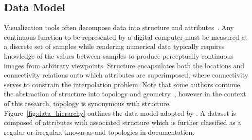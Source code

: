 \subsection{Data Model}
Visualization tools often decompose data into structure and
attributes~\cite{vtk}. Any continuous function to be represented by a
digital computer must be measured at a discrete set of samples while
rendering numerical data typically requires knowledge of the values
between samples to produce perceptually continuous images from
arbitrary viewpoints. Structure encapsulates both the locations and
connectivity relations onto which attributes are superimposed, where
connectivity serves to constrain the interpolation problem. Note that
some authors continue the abstraction of structure into topology and
geometry~\cite{weiler}, however in the context of this research,
topology is synonymous with structure. Figure~\ref{fig:data_hierarchy}
outlines the data model adopted by \sciwms{}. A dataset is composed of
attributes with associated structure which is further classified as a
regular or irregular, known as \cgrid{} and \ugrid{} topologies in
\sciwms{} documentation.

